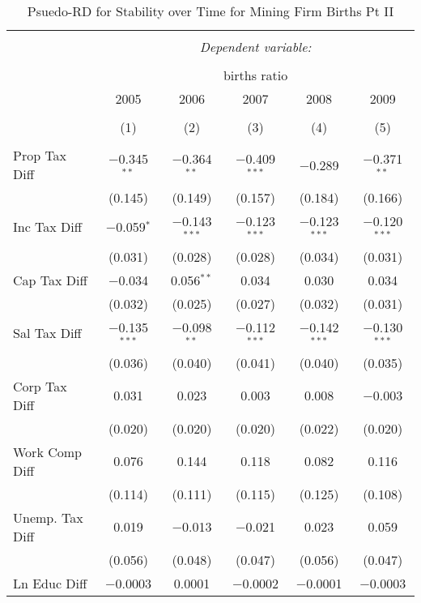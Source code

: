 
\begin{table}[!htbp] \centering 
  \caption{Psuedo-RD for Stability over Time for  Mining Firm Births Pt II} 
  \label{21year} 
\small 
\begin{tabular}{@{\extracolsep{5pt}}lccccc} 
\\[-1.8ex]\hline 
\hline \\[-1.8ex] 
 & \multicolumn{5}{c}{\textit{Dependent variable:}} \\ 
\cline{2-6} 
\\[-1.8ex] & \multicolumn{5}{c}{births ratio} \\ 
 & 2005 & 2006 & 2007 & 2008 & 2009 \\ 
\\[-1.8ex] & (1) & (2) & (3) & (4) & (5)\\ 
\hline \\[-1.8ex] 
 Prop Tax Diff & $-$0.345$^{**}$ & $-$0.364$^{**}$ & $-$0.409$^{***}$ & $-$0.289 & $-$0.371$^{**}$ \\ 
  & (0.145) & (0.149) & (0.157) & (0.184) & (0.166) \\ 
  Inc Tax Diff & $-$0.059$^{*}$ & $-$0.143$^{***}$ & $-$0.123$^{***}$ & $-$0.123$^{***}$ & $-$0.120$^{***}$ \\ 
  & (0.031) & (0.028) & (0.028) & (0.034) & (0.031) \\ 
  Cap Tax Diff & $-$0.034 & 0.056$^{**}$ & 0.034 & 0.030 & 0.034 \\ 
  & (0.032) & (0.025) & (0.027) & (0.032) & (0.031) \\ 
  Sal Tax Diff & $-$0.135$^{***}$ & $-$0.098$^{**}$ & $-$0.112$^{***}$ & $-$0.142$^{***}$ & $-$0.130$^{***}$ \\ 
  & (0.036) & (0.040) & (0.041) & (0.040) & (0.035) \\ 
  Corp Tax Diff & 0.031 & 0.023 & 0.003 & 0.008 & $-$0.003 \\ 
  & (0.020) & (0.020) & (0.020) & (0.022) & (0.020) \\ 
  Work Comp Diff & 0.076 & 0.144 & 0.118 & 0.082 & 0.116 \\ 
  & (0.114) & (0.111) & (0.115) & (0.125) & (0.108) \\ 
  Unemp. Tax Diff & 0.019 & $-$0.013 & $-$0.021 & 0.023 & 0.059 \\ 
  & (0.056) & (0.048) & (0.047) & (0.056) & (0.047) \\ 
  Ln Educ Diff & $-$0.0003 & 0.0001 & $-$0.0002 & $-$0.0001 & $-$0.0003 \\ 

\end{tabular}
\end{table}
